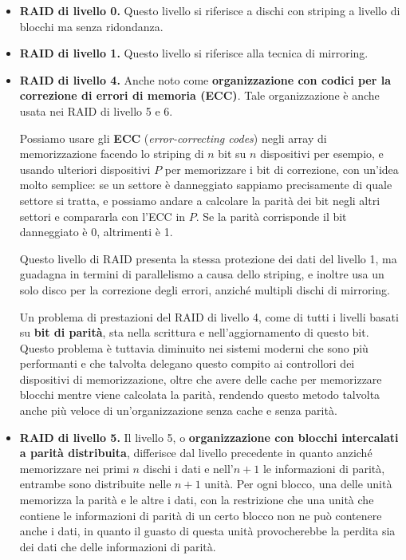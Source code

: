         \begin{itemize}
            \item \textbf{RAID di livello 0.} Questo livello si riferisce a dischi con striping a livello di blocchi ma senza ridondanza.
            
            \item \textbf{RAID di livello 1.} Questo livello si riferisce alla tecnica di mirroring.
            
            \item \textbf{RAID di livello 4.} Anche noto come \textbf{organizzazione con codici per la correzione di errori di memoria (ECC)}. Tale organizzazione è anche usata nei RAID di livello 5 e 6.
            
            Possiamo usare gli \textbf{ECC} (\textit{error-correcting codes}) negli array di memorizzazione facendo lo striping di $n$ bit su $n$ dispositivi per esempio, e usando ulteriori dispositivi $P$ per memorizzare i bit di correzione, con un'idea molto semplice: se un settore è danneggiato sappiamo precisamente di quale settore si tratta, e possiamo andare a calcolare la parità dei bit negli altri settori e compararla con l'ECC in $P$. Se la parità corrisponde il bit danneggiato è 0, altrimenti è 1.
            
            Questo livello di RAID presenta la stessa protezione dei dati del livello 1, ma guadagna in termini di parallelismo a causa dello striping, e inoltre usa un solo disco per la correzione degli errori, anziché multipli dischi di mirroring.
            
            Un problema di prestazioni del RAID di livello 4, come di tutti i livelli basati su \textbf{bit di parità}, sta nella scrittura e nell'aggiornamento di questo bit. Questo problema è tuttavia diminuito nei sistemi moderni che sono più performanti e che talvolta delegano questo compito ai controllori dei dispositivi di memorizzazione, oltre che avere delle cache per memorizzare blocchi mentre viene calcolata la parità, rendendo questo metodo talvolta anche più veloce di un'organizzazione senza cache e senza parità.
            
            \item \textbf{RAID di livello 5.} Il livello 5, o \textbf{organizzazione con blocchi intercalati a parità distribuita}, differisce dal livello precedente in quanto anziché memorizzare nei primi $n$ dischi i dati e nell'$n+1$ le informazioni di parità, entrambe sono distribuite nelle $n+1$ unità. Per ogni blocco, una delle unità memorizza la parità e le altre i dati, con la restrizione che una unità che contiene le informazioni di parità di un certo blocco non ne può contenere anche i dati, in quanto il guasto di questa unità provocherebbe la perdita sia dei dati che delle informazioni di parità.
            

\end{itemize}
